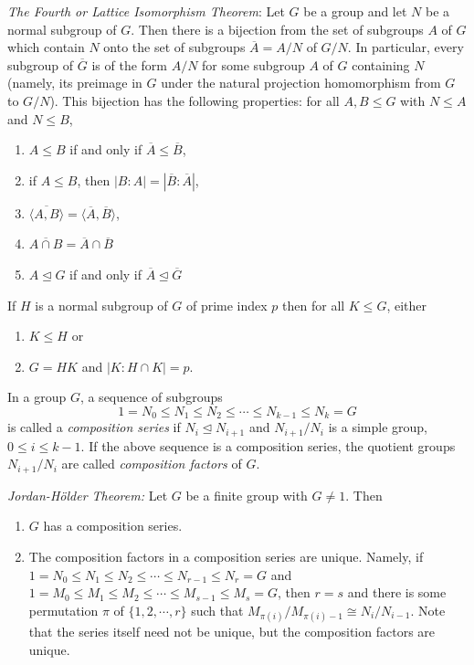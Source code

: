 \documentclass{article}
\numberwithin{equation}{section}
\theoremstyle{definition}
\numberwithin{definition}{section}
\numberwithin{theorem}{section}
\theoremstyle{remark}
\numberwithin{exercise}{section}
\begin{document}
\begin{enumerate}
    \textit{The Fourth or Lattice Isomorphism Theorem}: Let $G$ be a group and let $N$ be a normal subgroup of $G$. Then there is a bijection from the set of subgroups $A$ of $G$ which contain $N$ onto the set of subgroups $\overline{A}=A/N$ of $G/N$. In particular, every subgroup of $\overline{G}$ is of the form $A/N$ for some subgroup $A$ of $G$ containing $N$ (namely, its preimage in $G$ under the natural projection homomorphism from $G$ to $G/N$). This bijection has the following properties: for all $A,B\leq G$ with $N\leq A$ and $N\leq B$,
    \begin{enumerate}[i]
        \item $A\leq B$ if and only if $\overline{A}\leq\overline{B}$,
        \item if $A\leq B$, then $|B\mathrel{:}A|=|\overline{B}\mathrel{:}\overline{A}|$,
        \item $\overline{\langle A, B\rangle} = \langle\overline{A}, \overline{B}\rangle$,
        \item $\overline{A\cap B}=\overline{A}\cap\overline{B}$
        \item $A\unlhd G$ if and only if $\overline{A}\unlhd \overline{G}$
    \end{enumerate}
    \end{enumerate}
    
    If $H$ is a normal subgroup of $G$ of prime index $p$ then for all $K\leq G$, either
    \begin{enumerate}[i]
        \item $K\leq H$ or
        \item $G=HK$ and $|K:H\cap K|=p$.
    \end{enumerate}
    
    In a group $G$, a sequence of subgroups $$1=N_{0} \leq N_{1} \leq N_{2} \leq\cdots\leq N_{k-1}\leq N_{k}=G$$ is called a \textit{composition series} if $N_{i} \unlhd N_{i+1}$ and $N_{i+1}/N_{i}$ is a simple group, $0\leq i\leq k-1$. If the above sequence is a composition series, the quotient groups $N_{i+1}/N_{i}$ are called \textit{composition factors} of $G$.
    
    \textit{Jordan-H{\"o}lder Theorem:} Let $G$ be a finite group with $G\neq 1$. Then
    \begin{enumerate}[i]
        \item $G$ has a composition series.
        \item The composition factors in a composition series are unique. Namely, if $1=N_{0} \leq N_{1} \leq N_{2} \leq\cdots\leq N_{r-1}\leq N_{r}=G$ and $1=M_{0} \leq M_{1} \leq M_{2} \leq\cdots\leq M_{s-1}\leq M_{s}=G$, then $r=s$ and there is some permutation $\pi$ of $\{1,2,\cdots, r\}$ such that $M_{\pi(i)}/M_{\pi(i)-1}\cong N_{i}/N_{i-1}$. Note that the series itself need not be unique, but the composition factors are unique.
    \end{enumerate}    
    
\end{document}
